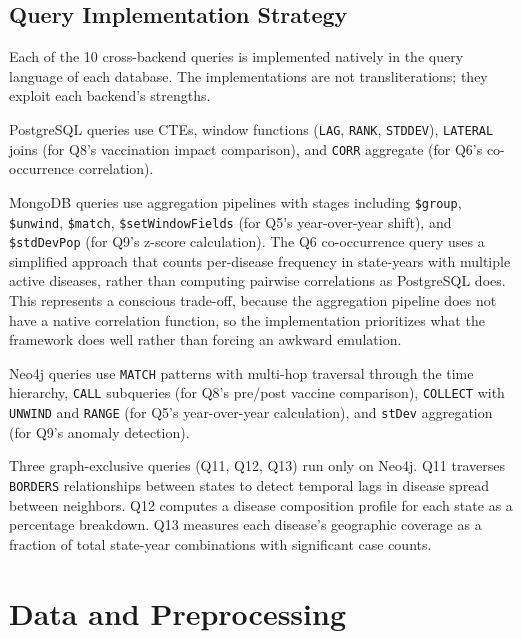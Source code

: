 \documentclass[12pt,a4paper]{article}
\begin{document}
\subsection{Query Implementation Strategy}

Each of the 10 cross-backend queries is implemented natively in the query language of each database. The implementations are not transliterations; they exploit each backend's strengths.

PostgreSQL queries use CTEs, window functions (\texttt{LAG}, \texttt{RANK}, \texttt{STDDEV}), \texttt{LATERAL} joins (for Q8's vaccination impact comparison), and \texttt{CORR} aggregate (for Q6's co-occurrence correlation).

MongoDB queries use aggregation pipelines with stages including \texttt{\$group}, \texttt{\$unwind}, \texttt{\$match}, \texttt{\$setWindowFields} (for Q5's year-over-year shift), and \texttt{\$stdDevPop} (for Q9's z-score calculation). The Q6 co-occurrence query uses a simplified approach that counts per-disease frequency in state-years with multiple active diseases, rather than computing pairwise correlations as PostgreSQL does. This represents a conscious trade-off, because the aggregation pipeline does not have a native correlation function, so the implementation prioritizes what the framework does well rather than forcing an awkward emulation.

Neo4j queries use \texttt{MATCH} patterns with multi-hop traversal through the time hierarchy, \texttt{CALL} subqueries (for Q8's pre/post vaccine comparison), \texttt{COLLECT} with \texttt{UNWIND} and \texttt{RANGE} (for Q5's year-over-year calculation), and \texttt{stDev} aggregation (for Q9's anomaly detection).

Three graph-exclusive queries (Q11, Q12, Q13) run only on Neo4j. Q11 traverses \texttt{BORDERS} relationships between states to detect temporal lags in disease spread between neighbors. Q12 computes a disease composition profile for each state as a percentage breakdown. Q13 measures each disease's geographic coverage as a fraction of total state-year combinations with significant case counts.


\section{Data and Preprocessing}
\label{sec:data}
\end{document}
